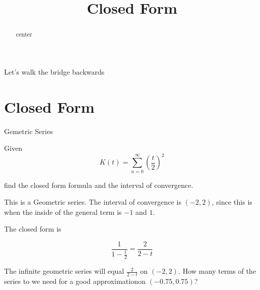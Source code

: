 \documentclass{ximera}
\title{Closed Form}
\begin{document}
\begin{abstract}
center
\end{abstract}
\maketitle






Let's walk the bridge backwards



\section{Closed Form}



\begin{example} Gemetric Series


Given 
\[    K(t) =   \sum_{n=0}^{\infty}  \left( \frac{t}{2} \right)^2\]

find the closed form formula and the interval of convergence.




\begin{explanation}


This is a Geometric series.  The interval of convergence is $(-2, 2)$, since this is when the inside of the general term is $-1$ and $1$.


The closed form is

\[  \frac{1}{1 - \frac{t}{2}}  =     \frac{2}{2-t}           \]



\end{explanation}


\end{example}




The infinite geometric series will equal $\frac{2}{2-t}$ on $(-2, 2)$.  How many terms of the series to we need for a good approximationon $(-0.75, 0.75)$?



\begin{center}
\end{center}
\end{document}
